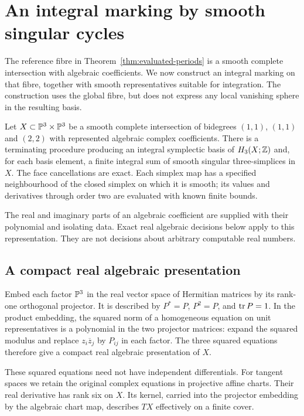 \section{An integral marking by smooth singular cycles}
\label{sec:integral-marking}

The reference fibre in Theorem~\ref{thm:evaluated-periods} is a
smooth complete intersection with algebraic coefficients. We now
construct an integral marking on that fibre, together with smooth
representatives suitable for integration. The construction uses the
global fibre, but does not express any local vanishing sphere in the
resulting basis.

\begin{theorem}\label{thm:smooth-marking}
Let $X\subset\mathbb P^3\times\mathbb P^3$ be a smooth complete intersection
of bidegrees $(1,1)$, $(1,1)$ and $(2,2)$ with represented algebraic complex
coefficients. There is a terminating procedure producing an integral
symplectic basis of $H_3(X;\mathbb Z)$ and, for each basis element, a finite
integral sum of smooth singular three-simplices in $X$.
The face cancellations are exact. Each simplex map has a specified
neighbourhood of the closed simplex on which it is smooth; its values
and derivatives through order two are evaluated with known finite bounds.
\end{theorem}

The real and imaginary parts of an algebraic coefficient are supplied
with their polynomial and isolating data. Exact real algebraic decisions
below apply to this representation. They are not decisions about
arbitrary computable real numbers.

\subsection{A compact real algebraic presentation}

Embed each factor $\mathbb P^3$ in the real vector space of Hermitian
matrices by its rank-one orthogonal projector. It is described by
$P^*=P$, $P^2=P$, and $\operatorname{tr} P=1$. In the product embedding, the
squared norm of a homogeneous equation on unit representatives is
a polynomial in the two projector matrices: expand the squared
modulus and replace $z_i\overline z_j$ by $P_{ij}$ in each factor.
The three squared equations therefore give a compact real algebraic
presentation of $X$.

These squared equations need not have independent differentials.
For tangent spaces we retain the original complex equations in
projective affine charts. Their real derivative has rank six on
$X$. Its kernel, carried into the projector embedding by the
algebraic chart map, describes $TX$ effectively on a finite cover.

